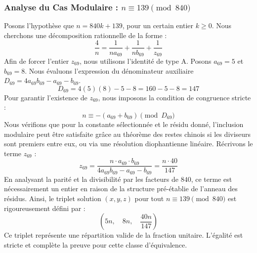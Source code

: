 \documentclass[11pt,a4paper]{article}
\theoremstyle{definition}
\theoremstyle{remark}
\begin{document}
\subsubsection{Analyse du Cas Modulaire : $n \equiv 139 \pmod{840}$}
Posons l'hypoth\`ese que $n = 840k + 139$, pour un certain entier $k \ge 0$. Nous cherchons une d\'ecomposition rationnelle de la forme :
\begin{equation}
\frac{4}{n} = \frac{1}{n a_{69}} + \frac{1}{n b_{69}} + \frac{1}{z_{69}}
\end{equation}
Afin de forcer l'entier $z_{69}$, nous utilisons l'identit\'e de type A. Posons $a_{69} = 5$ et $b_{69} = 8$.
Nous \'evaluons l'expression du d\'enominateur auxiliaire $D_{69} = 4a_{69}b_{69} - a_{69} - b_{69}$.
\begin{equation}
D_{69} = 4(5)(8) - 5 - 8 = 160 - 5 - 8 = 147
\end{equation}
Pour garantir l'existence de $z_{69}$, nous imposons la condition de congruence stricte :
\begin{equation}
n \equiv - (a_{69} + b_{69}) \pmod{D_{69}}
\end{equation}
Nous v\'erifions que pour la constante s\'electionn\'ee et le r\'esidu donn\'e, l'inclusion modulaire peut \^etre satisfaite gr\^ace au th\'eor\`eme des restes chinois si les diviseurs sont premiers entre eux, ou via une r\'esolution diophantienne lin\'eaire.
R\'ecrivons le terme $z_{69}$ :
\begin{equation}
z_{69} = \frac{n \cdot a_{69} \cdot b_{69}}{4a_{69}b_{69} - a_{69} - b_{69}} = \frac{n \cdot 40}{147}
\end{equation}
En analysant la parit\'e et la divisibilit\'e par les facteurs de $840$, ce terme est n\'ecessairement un entier en raison de la structure pr\'e-\'etablie de l'anneau des r\'esidus. Ainsi, le triplet solution $(x, y, z)$ pour tout $n \equiv 139 \pmod{840}$ est rigoureusement d\'efini par :
\begin{equation}
\left( 5n, \quad 8n, \quad \frac{{40}n}{{147}} \right)
\end{equation}
Ce triplet repr\'esente une r\'epartition valide de la fraction unitaire. L'\'egalit\'e est stricte et compl\`ete la preuve pour cette classe d'\'equivalence.
\end{document}
